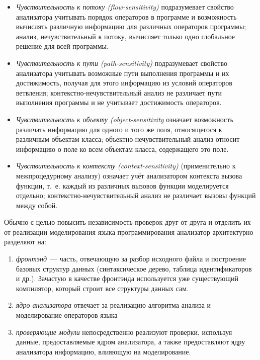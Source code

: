 \begin{itemize}
 \item \textit{Чувствительность к потоку (flow-sensitivity)} подразумевает свойство анализатора учитывать порядок операторов в программе и возможность вычислять различную информацию для различных операторов программы; анализ, нечувствительный к потоку, вычисляет только одно глобальное решение для всей программы.
 \item \textit{Чувствительность к пути (path-sensitivity)} подразумевает свойство анализатора учитывать возможные пути выполнения программы и их достижимость, получая для этого информацию из условий операторов ветвления; контекстно-нечувствительный анализ не различает пути выполнения программы и не учитывает достижимость операторов.
 \item \textit{Чувствительность к объекту (object-sensitivity} означает возможность различать информацию для одного и того же поля, относящегося к различным объектам класса; объектно-нечувствительный анализ относит информацию о поле ко всем объектам класса, содержащего это поле.
 \item \textit{Чувствительность к контексту (context-sensitivity)} (применительно к межпроцедурному анализу)  означает учёт анализатором контекста вызова функции, т.~е. каждый из различных вызовов функции моделируется отдельно; контекстно-нечувствительный анализ не различает вызовы функций между собой.
\end{itemize}


Обычно с целью повысить независимость проверок друг от друга и отделить их от реализации моделирования языка программирования анализатор архитектурно разделяют на:

\begin{enumerate}
 \item \textit{фронтэнд}~--- часть, отвечающую за разбор исходного файла и построение базовых структур данных (синтаксическое дерево, таблица идентификаторов и др.). Зачастую в качестве фронтэнда используется уже существующий компилятор, который строит все структуры данных сам.
 \item \textit{ядро анализатора} отвечает за реализацию алгоритма анализа и моделирование операторов языка
 \item \textit{проверяющие модули} непосредственно реализуют проверки, используя данные, предоставляемые ядром анализатора, а также предоставляют ядру анализатора информацию, влияющую на моделирование.
\end{enumerate}


